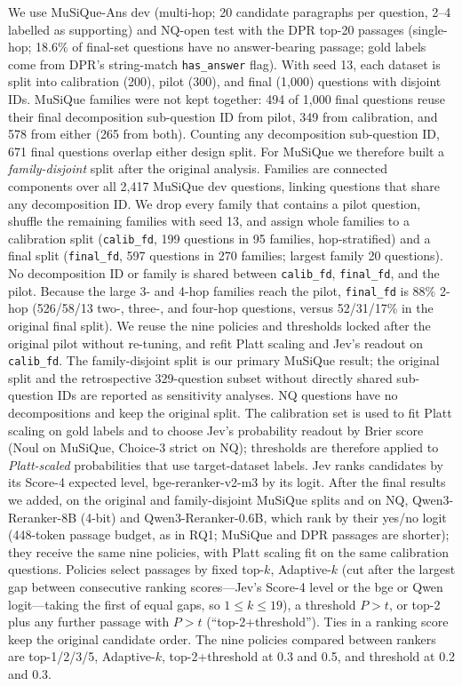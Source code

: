 We use MuSiQue-Ans dev\cite{trivedi2022musique} (multi-hop; 20 candidate paragraphs per question, 2--4 labelled as supporting) and NQ-open test\cite{kwiatkowski2019nq} with the DPR top-20 passages\cite{karpukhin2020dpr} (single-hop; 18.6\% of final-set questions have no answer-bearing passage; gold labels come from DPR's string-match \texttt{has\_answer} flag).
With seed 13, each dataset is split into calibration (200), pilot (300), and final (1,000) questions with disjoint IDs. MuSiQue families were not kept together: 494 of 1,000 final questions reuse their final decomposition sub-question ID from pilot, 349 from calibration, and 578 from either (265 from both). Counting any decomposition sub-question ID, 671 final questions overlap either design split.
For MuSiQue we therefore built a \emph{family-disjoint} split after the original analysis. Families are connected components over all 2{,}417 MuSiQue dev questions, linking questions that share any decomposition ID. We drop every family that contains a pilot question, shuffle the remaining families with seed 13, and assign whole families to a calibration split (\texttt{calib\_fd}, 199 questions in 95 families, hop-stratified) and a final split (\texttt{final\_fd}, 597 questions in 270 families; largest family 20 questions). No decomposition ID or family is shared between \texttt{calib\_fd}, \texttt{final\_fd}, and the pilot. Because the large 3- and 4-hop families reach the pilot, \texttt{final\_fd} is 88\% 2-hop (526/58/13 two-, three-, and four-hop questions, versus 52/31/17\% in the original final split). We reuse the nine policies and thresholds locked after the original pilot without re-tuning, and refit Platt scaling and Jev's readout on \texttt{calib\_fd}. The family-disjoint split is our primary MuSiQue result; the original split and the retrospective 329-question subset without directly shared sub-question IDs are reported as sensitivity analyses. NQ questions have no decompositions and keep the original split.
The calibration set is used to fit Platt scaling on gold labels and to choose Jev's probability readout by Brier score (Noul on MuSiQue, Choice-3 strict on NQ); thresholds are therefore applied to \emph{Platt-scaled} probabilities that use target-dataset labels.
Jev ranks candidates by its Score-4 expected level, bge-reranker-v2-m3 by its logit. After the final results we added, on the original and family-disjoint MuSiQue splits and on NQ, Qwen3-Reranker-8B (4-bit) and Qwen3-Reranker-0.6B, which rank by their yes/no logit (448-token passage budget, as in RQ1; MuSiQue and DPR passages are shorter); they receive the same nine policies, with Platt scaling fit on the same calibration questions. Policies select passages by fixed top-$k$, Adaptive-$k$ (cut after the largest gap between consecutive ranking scores\cite{adaptivek2025}---Jev's Score-4 level or the bge or Qwen logit---taking the first of equal gaps, so $1\le k\le19$), a threshold $P>t$, or top-2 plus any further passage with $P>t$ (``top-2+threshold''). Ties in a ranking score keep the original candidate order. The nine policies compared between rankers are top-1/2/3/5, Adaptive-$k$, top-2+threshold at 0.3 and 0.5, and threshold at 0.2 and 0.3.
